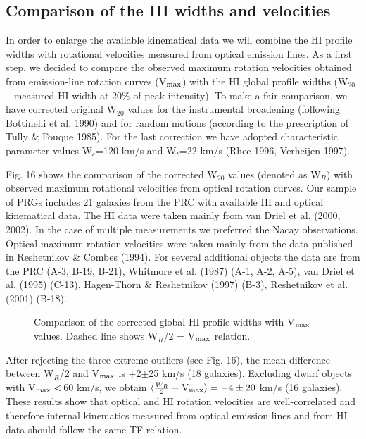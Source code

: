 \documentclass[]{aa}
\begin{document}
\subsection{Comparison of the HI widths and velocities}

In order to enlarge the available kinematical data we will combine 
the HI profile widths with rotational velocities measured from
optical emission lines. 
As a first step, we decided to compare the observed 
maximum rotation velocities obtained from emission-line rotation 
curves (V$_{\rm max}$) with the HI global profile widths (W$_{20}$ --
measured HI width at 20\% of peak intensity).  
To make a fair comparison, we have corrected original W$_{20}$
values for the instrumental broadening (following Bottinelli et al. 1990)
and for random motions (according to the prescription of
Tully \& Fouque 1985). For the last correction we have adopted
characteristic parameter values W$_c$=120 km/s and W$_t$=22 km/s
(Rhee 1996, Verheijen 1997).

Fig. 16 shows the comparison of the corrected W$_{20}$ values
(denoted as W$_R$) with observed maximum rotational velocities 
from optical rotation curves. Our sample of PRGs includes 
21 galaxies from the PRC with available HI and optical kinematical 
data. The HI data were taken mainly from van Driel et al. (2000, 2002).
In the case of multiple measurements we preferred the Nacay 
observations. Optical maximum rotation velocities were taken
mainly from the data published in Reshetnikov \& Combes (1994).
For several additional objects the data are from the PRC (A-3, B-19,
B-21), Whitmore et al. (1987) (A-1, A-2, A-5), van Driel et al. (1995)
(C-13), Hagen-Thorn \& Reshetnikov (1997) (B-3), Reshetnikov et al.
(2001) (B-18).

\begin{figure}
\centerline{}
\caption{ Comparison of the corrected global HI profile widths with
V$_{\rm max}$ values. Dashed line shows W$_R$/2 = V$_{\rm max}$ relation.}
\end{figure}

After rejecting the three extreme outliers (see Fig. 16), the
mean difference between W$_R$/2 and V$_{\rm max}$ is +2$\pm$25 km/s
(18 galaxies). Excluding dwarf objects with V$_{\rm max}<$\,60 km/s,
we obtain $\langle \frac{W_R}{2}-{\rm V}_{\rm max}\rangle = -4\pm20$ km/s
(16 galaxies). These results show that optical and HI rotation velocities
are well-correlated and therefore internal kinematics measured 
from optical emission lines and from HI data should follow the same
TF relation. 
\end{document}
